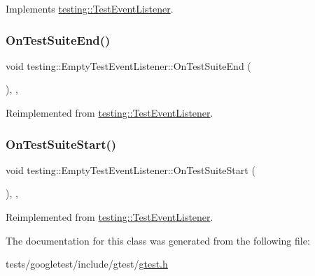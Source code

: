 Implements \hyperlink{classtesting_1_1TestEventListener_ab4f6a0ca16ae75daf385b3b5914e1048}{testing\+::\+Test\+Event\+Listener}.

\mbox{\label{classtesting_1_1EmptyTestEventListener_aefdb73682d290791461e186d864db718}} 
\subsubsection{\texorpdfstring{On\+Test\+Suite\+End()}{OnTestSuiteEnd()}}
{\footnotesize\ttfamily void testing\+::\+Empty\+Test\+Event\+Listener\+::\+On\+Test\+Suite\+End (\begin{DoxyParamCaption}\item[{const \hyperlink{classtesting_1_1TestSuite}{Test\+Suite} \&}]{ }\end{DoxyParamCaption})\hspace{0.3cm}{\ttfamily [inline]}, {\ttfamily [override]}, {\ttfamily [virtual]}}



Reimplemented from \hyperlink{classtesting_1_1TestEventListener_a8962caad5d2522c9160c794074a662ee}{testing\+::\+Test\+Event\+Listener}.

\mbox{\label{classtesting_1_1EmptyTestEventListener_a1e32e4bd4857822b6b50e6900aa5c651}} 
\subsubsection{\texorpdfstring{On\+Test\+Suite\+Start()}{OnTestSuiteStart()}}
{\footnotesize\ttfamily void testing\+::\+Empty\+Test\+Event\+Listener\+::\+On\+Test\+Suite\+Start (\begin{DoxyParamCaption}\item[{const \hyperlink{classtesting_1_1TestSuite}{Test\+Suite} \&}]{ }\end{DoxyParamCaption})\hspace{0.3cm}{\ttfamily [inline]}, {\ttfamily [override]}, {\ttfamily [virtual]}}



Reimplemented from \hyperlink{classtesting_1_1TestEventListener_a2726cc70dfda861f109355f1d9f09dfe}{testing\+::\+Test\+Event\+Listener}.



The documentation for this class was generated from the following file\+:\begin{DoxyCompactItemize}
\item 
tests/googletest/include/gtest/\hyperlink{gtest_8h}{gtest.\+h}\end{DoxyCompactItemize}
